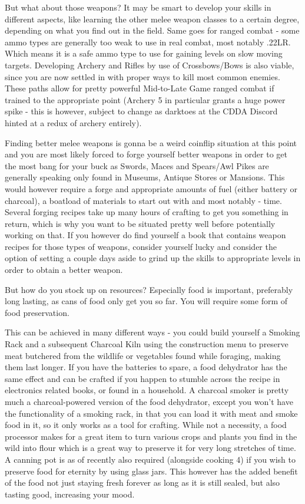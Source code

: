But what about those weapons? It may be smart to develop your skills in different aspects, like learning the other melee weapon classes to a certain degree, depending on what you find out in the field. Same goes for ranged combat - some ammo types are generally too weak to use in real combat, most notably .22LR. Which means it is a safe ammo type to use for gaining levels on slow moving targets. Developing Archery and Rifles by use of Crossbows/Bows is also viable, since you are now settled in with proper ways to kill most common enemies. These paths allow for pretty powerful Mid-to-Late Game ranged combat if trained to the appropriate point (Archery 5 in particular grants a huge power spike - this is however, subject to change as darktoes at the CDDA Discord hinted at a redux of archery entirely).

Finding better melee weapons is gonna be a weird coinflip situation at this point and you are most likely forced to forge yourself better weapons in order to get the most bang for your buck as Swords, Maces and Spears/Awl Pikes are generally speaking only found in Museums, Antique Stores or Mansions. This would however require a forge and appropriate amounts of fuel (either battery or charcoal), a boatload of materials to start out with and most notably - time. Several forging recipes take up many hours of crafting to get you something in return, which is why you want to be situated pretty well before potentially working on that. If you however do find yourself a book that contains weapon recipes for those types of weapons, consider yourself lucky and consider the option of setting a couple days aside to grind up the skills to appropriate levels in order to obtain a better weapon.

But how do you stock up on resources? Especially food is important, preferably long lasting, as cans of food only get you so far. You will require some form of food preservation.

This can be achieved in many different ways - you could build yourself a Smoking Rack and a subsequent Charcoal Kiln using the construction menu to preserve meat butchered from the wildlife or vegetables found while foraging, making them last longer. If you have the batteries to spare, a food dehydrator has the same effect and can be crafted if you happen to stumble across the recipe in electronics related books, or found in a household. A charcoal smoker is pretty much a charcoal-powered version of the food dehydrator, except you won't have the functionality of a smoking rack, in that you can load it with meat and smoke food in it, so it only works as a tool for crafting. While not a necessity, a food processor makes for a great item to turn various crops and plants you find in the wild into flour which is a great way to preserve it for very long stretches of time. A canning pot is as of recently also required (alongside cooking 4) if you wish to preserve food for eternity by using glass jars. This however has the added benefit of the food not just staying fresh forever as long as it is still sealed, but also tasting good, increasing your mood.


